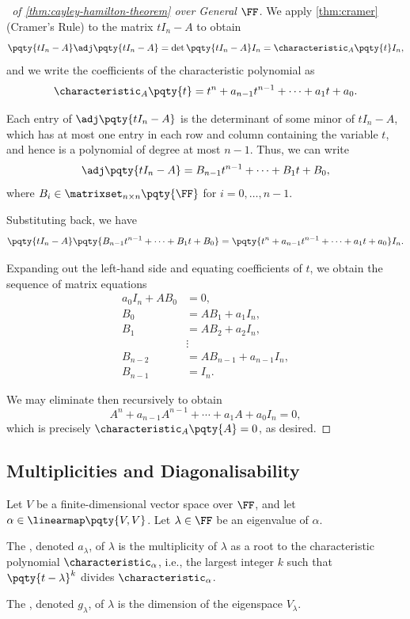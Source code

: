 \begin{proof}[\proofname\ of \autoref{thm:cayley-hamilton-theorem} over General \(\FF\)]
    We apply \autoref{thm:cramer} (Cramer's Rule) to the matrix \(t I_n - A\) to obtain
    \[
        \pqty{t I_n - A} \adj\pqty{t I_n - A} = \det\pqty{t I_n - A} I_n = \characteristic_{A}\pqty{t} I_n,
    \]
    and we write the coefficients of the characteristic polynomial as
    \[
        \characteristic_{A}\pqty{t} = t^n + a_{n - 1} t^{n - 1} + \cdots + a_1 t + a_0.
    \]

    Each entry of \(\adj\pqty{t I_n - A}\) is the determinant of some minor of \(t I_n - A\), which has at most one entry in each row and column containing the variable \(t\), and hence is a polynomial of degree at most \(n - 1\). Thus, we can write
    \[
        \adj\pqty{t I_n - A} = B_{n -1} t^{n - 1} + \cdots + B_1 t + B_0,
    \]
    where \(B_i \in \matrixset_{n \times n} \pqty{\FF}\) for \(i = 0, \ldots, n - 1\).

    Substituting back, we have
    \[
        \pqty{t I_n - A} \pqty{B_{n - 1} t^{n - 1} + \cdots + B_1 t + B_0} = \pqty{t^n + a_{n - 1} t^{n - 1} + \cdots + a_1 t + a_0} I_n.
    \]

    Expanding out the left-hand side and equating coefficients of \(t\), we obtain the sequence of matrix equations
    \begin{align*}
        a_0 I_n + A B_0 &= 0, \\
        B_0 &= A B_1 + a_1 I_n, \\
        B_1 &= A B_2 + a_2 I_n, \\
        &\vdots \\
        B_{n - 2} &= A B_{n - 1} + a_{n - 1} I_n, \\
        B_{n - 1} &= I_n.
    \end{align*}

    We may eliminate then recursively to obtain
    \[
        A^n + a_{n - 1} A^{n - 1} + \cdots + a_1 A + a_0 I_n = 0,
    \]
    which is precisely \(\characteristic_{A}\pqty{A} = 0\), as desired.
\end{proof}

\subsection{Multiplicities and Diagonalisability}

\begin{definition}
    Let \(V\) be a finite-dimensional vector space over \(\FF\), and let \(\alpha \in \linearmap\pqty{V, V}\). Let \(\lambda \in \FF\) be an eigenvalue of \(\alpha\).
    
    The , denoted \(a_{\lambda}\), of \(\lambda\) is the multiplicity of \(\lambda\) as a root to the characteristic polynomial \(\characteristic_{\alpha}\), i.e., the largest integer \(k\) such that \(\pqty{t - \lambda}^k\) divides \(\characteristic_{\alpha}\).

    The , denoted \(g_{\lambda}\), of \(\lambda\) is the dimension of the eigenspace \(V_{\lambda}\).
\end{definition}

